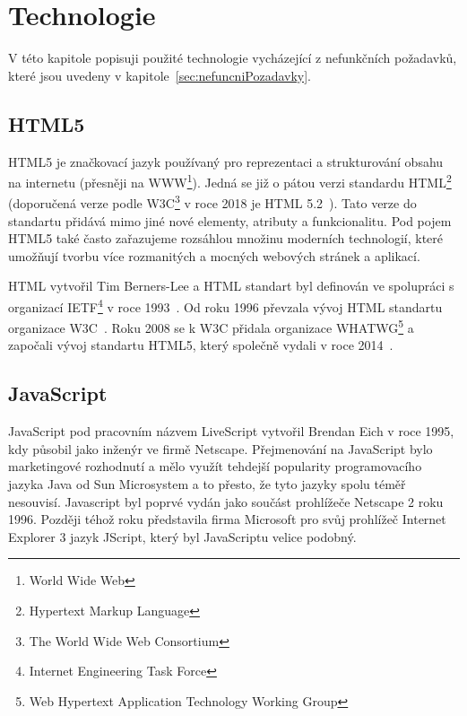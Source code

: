 
\section{Technologie}\label{sec:technologie}
V této kapitole popisuji použité technologie vycházející z nefunkčních požadavků, které jsou uvedeny v kapitole~\ref{sec:nefuncniPozadavky}.

\subsection{HTML5}\label{subsec:html5}

HTML5 je značkovací jazyk používaný pro reprezentaci a strukturování  obsahu na internetu (přesněji na WWW\footnote{World Wide Web}).
Jedná se již o pátou verzi standardu HTML\footnote{Hypertext Markup Language} (doporučená verze podle W3C\footnote{The World Wide Web Consortium} v roce 2018 je HTML 5.2~\cite{w3c:html52}).
Tato verze do standartu přidává mimo jiné nové elementy, atributy a funkcionalitu.
Pod pojem HTML5 také často zařazujeme rozsáhlou množinu moderních technologií, které umožňují tvorbu více rozmanitých a mocných webových stránek a aplikací.~\cite{mozzila:html5}

HTML vytvořil Tim Berners-Lee a HTML standart byl definován ve spolupráci s organizací IETF\footnote{Internet Engineering Task Force} v roce 1993~\cite{html:autor}.
Od roku 1996 převzala vývoj HTML standartu organizace W3C~\cite{w3c:html32}.
Roku 2008 se k W3C přidala organizace WHATWG\footnote{Web Hypertext Application Technology Working Group} a započali vývoj standartu HTML5, který společně vydali v roce 2014~\cite{w3c:html5}.


\subsection{JavaScript}\label{subsec:javascript}

JavaScript pod pracovním názvem LiveScript vytvořil Brendan Eich v roce 1995, kdy působil jako inženýr ve firmě Netscape.
Přejmenování na JavaScript bylo marketingové rozhodnutí a mělo využít tehdejší popularity programovacího jazyka Java od Sun Microsystem a to přesto, že tyto jazyky spolu téměř nesouvisí.
Javascript byl poprvé vydán jako součást prohlížeče Netscape 2 roku 1996.
Později téhož roku představila firma Microsoft pro svůj prohlížeč Internet Explorer 3 jazyk JScript, který byl JavaScriptu velice podobný.~\cite{mozzila:javascript}


